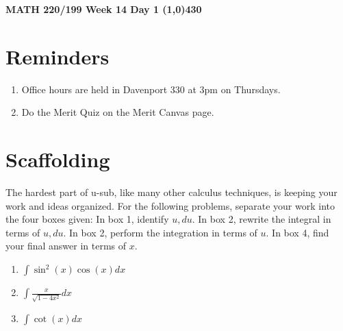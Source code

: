 \documentclass{article}
\begin{document}
\begin{center}
 \LARGE\bfseries MATH 220/199 Week 14 Day 1
 \line(1,0){430}
\end{center}
\section*{Reminders}
\begin{enumerate}
    \item Office hours are held in Davenport 330 at 3pm on Thursdays.
    \item Do the Merit Quiz on the Merit Canvas page.
\end{enumerate}
\section*{Scaffolding}
The hardest part of u-sub, like many other calculus techniques, is keeping your work and ideas organized. For the following problems, separate your work into the four boxes given: In box 1, identify $u, du$. In box 2, rewrite the integral in terms of $u, du$. In box 2, perform the integration in terms of $u$. In box 4, find your final answer in terms of $x$.
\begin{enumerate}
    \item $\int \sin^2(x)\cos(x) dx$
    \newline
    \newline
    \newpage
    \item $\int \frac{x}{\sqrt{1-4x^2}} dx$
    \newline
    \newline
    \vfill
    \item $\int \cot(x) dx$
    \newline
    \newline
    \vfill
\end{enumerate}
\end{document}
